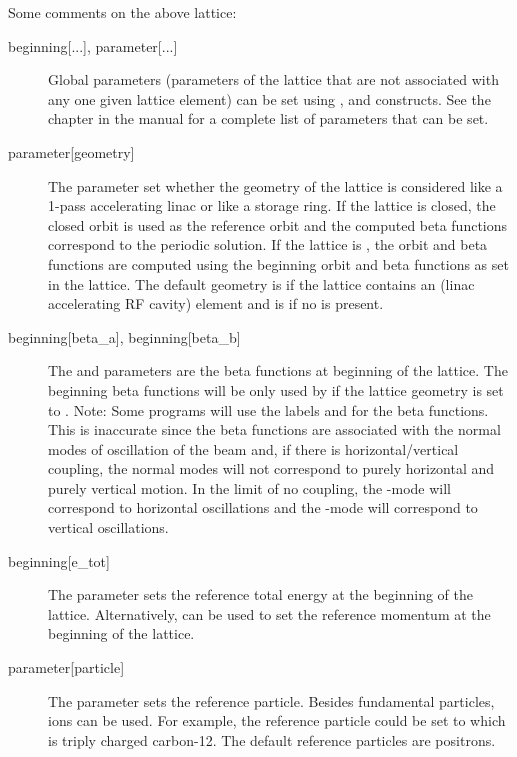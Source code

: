 \documentclass{hitec}
\begin{document}
Some comments on the above lattice:
  \begin{description}
  \item[{beginning[...], parameter[...]}] \Newline
Global parameters (parameters of the lattice that are not associated with any one given lattice
element) can be set using ,  and 
constructs. See the  chapter in the \bmad manual for a
complete list of parameters that can be set.
  \item[{parameter[geometry]}] \Newline
The  parameter set whether the geometry of the lattice is considered
 like a 1-pass accelerating linac or  like a storage ring. If the lattice is
closed, the closed orbit is used as the reference orbit and the computed beta functions
correspond to the periodic solution. If the lattice is , the orbit and beta functions
are computed using the beginning orbit and beta functions as set in the lattice. The default
geometry is  if the lattice contains an  (linac accelerating RF cavity) 
element and is  if no  is present.
  \item[{beginning[beta_a], beginning[beta_b]}] \Newline
The  and  parameters are the beta functions at beginning
of the lattice. The beginning beta functions will be only used by \bmad if the lattice geometry is
set to . Note: Some programs will use the labels  and  for the beta
functions. This is inaccurate since the beta functions are associated with the normal modes of
oscillation of the beam and, if there is horizontal/vertical coupling, the normal modes will not
correspond to purely horizontal and purely vertical motion. In the limit of no coupling, the
-mode will correspond to horizontal oscillations and the -mode will correspond to
vertical oscillations.
  \item[{beginning[e_tot]}] \Newline
The  parameter sets the reference total energy at the beginning of the lattice.
Alternatively,  can be used to set the reference momentum at the beginning of the
lattice.
  \item[{parameter[particle]}] \Newline
The  parameter sets the reference particle. Besides fundamental particles,
ions can be used. For example, the reference particle could be set to  which is triply
charged carbon-12. The default reference particles are positrons.

\end{description}
\end{document}
